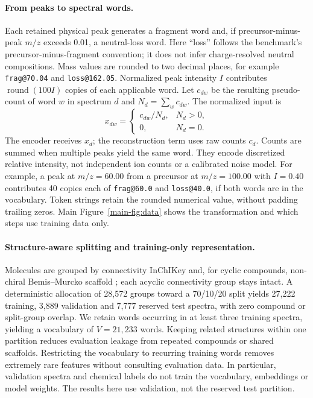 \documentclass[10pt,a4paper]{article}
\begin{document}
\paragraph{From peaks to spectral words.}
Each retained physical peak generates a fragment word and, if precursor-minus-peak
$m/z$ exceeds 0.01, a neutral-loss word. Here ``loss'' follows the benchmark's
precursor-minus-fragment convention; it does not infer charge-resolved
neutral compositions. Mass values are rounded to two decimal
places, for example \texttt{frag@70.04} and \texttt{loss@162.05}.
Normalized peak intensity $I$ contributes $\operatorname{round}(100I)$ copies
of each applicable word. Let $c_{dw}$ be the resulting pseudo-count of word
$w$ in spectrum $d$ and $N_d=\sum_w c_{dw}$. The normalized input is
\[
 x_{dw}=\begin{cases}c_{dw}/N_d,&N_d>0,\\0,&N_d=0.\end{cases}
\]
The encoder receives $x_d$; the reconstruction term uses raw counts $c_d$.
Counts are summed when multiple peaks yield the same word. They encode
discretized relative intensity, not independent ion counts or a calibrated
noise model. For example, a peak at $m/z=60.00$ from a precursor at
$m/z=100.00$ with $I=0.40$ contributes 40 copies each of
\texttt{frag@60.0} and \texttt{loss@40.0}, if both words are in the vocabulary.
Token strings retain the rounded numerical value, without padding trailing zeros.
Main Figure~\ref{main-fig:data} shows the transformation and which steps use training data only.

\paragraph{Structure-aware splitting and training-only representation.}
Molecules are grouped by connectivity InChIKey and, for cyclic compounds,
non-chiral Bemis--Murcko scaffold \cite{bemismurcko1996}; each acyclic
connectivity group stays intact. A deterministic allocation of
28,572 groups toward a 70/10/20 split yields 27,222 training, 3,889 validation
and 7,777 reserved test spectra, with zero compound or split-group overlap.
We retain words occurring in at least three training spectra, yielding a
vocabulary of $V=21,233$ words. Keeping related structures within one partition
reduces evaluation leakage from repeated compounds or shared scaffolds.
Restricting the vocabulary to recurring training words removes extremely
rare features without consulting evaluation data. In particular,
validation spectra and chemical labels do not train the vocabulary,
embeddings or model weights. The results here use validation, not the reserved
test partition.
\end{document}
